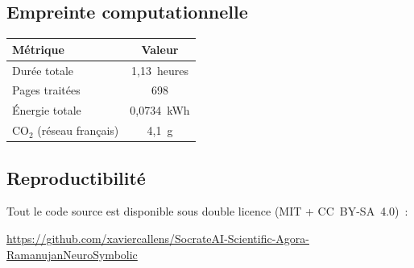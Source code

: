 \subsection{Empreinte computationnelle}
\begin{center}
\begin{tabular}{lc}
\toprule
\textbf{Métrique} & \textbf{Valeur} \\
\midrule
Durée totale & 1,13~heures \\
Pages traitées & 698 \\
Énergie totale & 0,0734~kWh \\
CO$_2$ (réseau français) & 4,1~g \\
\bottomrule
\end{tabular}
\end{center}

\subsection{Reproductibilité}
Tout le code source est disponible sous double licence (MIT + CC~BY-SA~4.0)~:
\begin{center}
\url{https://github.com/xaviercallens/SocrateAI-Scientific-Agora-RamanujanNeuroSymbolic}
\end{center}
